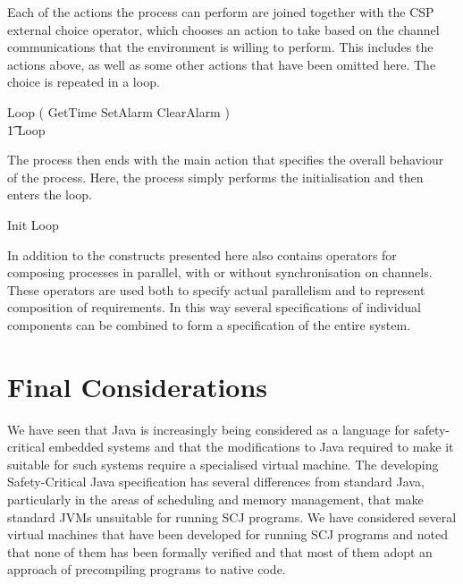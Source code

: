 \documentclass[a4paper,10pt]{report}
\begin{document}
%
Each of the actions the process can perform are joined together with
the CSP external choice operator, which chooses an action to take
based on the channel communications that the environment is willing to
perform.
This includes the actions above, as well as some other actions that
have been omitted here.
The choice is repeated in a loop.
%
\begin{circusaction}
  Loop \circdef \left( GetTime \extchoice SetAlarm \extchoice
    ClearAlarm
    \extchoice \cdots \right) \\
  \t1 \circseq Loop
\end{circusaction}
%
The \Circus{} process then ends with the main action that specifies
the overall behaviour of the process.
Here, the process simply performs the initialisation and then enters
the loop.
%
\begin{circusaction}
  \circspot Init \circseq Loop
\end{circusaction}
\begin{circus}
  \circend
\end{circus}

In addition to the constructs presented here \Circus{} also contains
operators for composing processes in parallel, with or without
synchronisation on channels.
These operators are used both to specify actual parallelism and to
represent composition of requirements.
In this way several \Circus{} specifications of individual components
can be combined to form a specification of the entire system.


\section{Final Considerations}
\label{final-considerations-section}


We have seen that Java is increasingly being considered as a language
for safety-critical embedded systems and that the modifications to
Java required to make it suitable for such systems require a
specialised virtual machine.
The developing Safety-Critical Java specification has several
differences from standard Java, particularly in the areas of
scheduling and memory management, that make standard JVMs unsuitable
for running SCJ programs.
We have considered several virtual machines that have been developed
for running SCJ programs and noted that none of them has been formally
verified and that most of them adopt an approach of precompiling
programs to native code.
\end{document}
